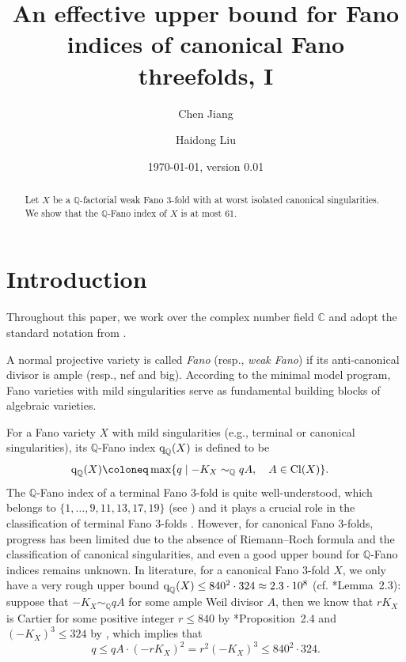\documentclass[12pt,twoside]{amsart}
\title[An effective upper bound for Fano indices]
{An effective upper bound for Fano indices of canonical Fano threefolds, I}
\date{\today, version 0.01}
\author{Chen Jiang}
\author{Haidong Liu}
\DeclareMathOperator{\Cl}{Cl}
\newcommand{\qQ}{\text{\rm q}_{\mathbb{Q}}}
\theoremstyle{definition}
\begin{document}
\begin{abstract}
    Let $X$ be a $\mathbb Q$-factorial weak Fano $3$-fold with at worst isolated canonical singularities. We show that the $\mathbb Q$-Fano index of $X$ is at most $61$.
\end{abstract}


\maketitle 
\tableofcontents


\section{Introduction}\label{sec1}

Throughout this paper, we work over the complex number field $\mathbb C$ and adopt the standard notation from \cites{kollar-mori}.

A normal projective variety is called \emph{Fano} (resp., \emph{weak Fano}) if its anti-canonical divisor is ample (resp., nef and big). According to the minimal model program,  Fano varieties with mild singularities serve as fundamental building blocks of algebraic varieties.

For a Fano variety  $X$ with mild singularities (e.g., terminal or canonical singularities), its $\mathbb Q$-Fano index $\qQ(X)$ is defined to be 
\begin{align*} 
    \qQ(X) {}&\coloneq \max\{q \mid -K_X \sim_{\mathbb Q}qA, \quad A\in \Cl (X) \}. 
\end{align*}
The $\mathbb{Q}$-Fano index of a terminal Fano $3$-fold is quite well-understood, which belongs to $\{1,\dots,9, 11, 13,17, 19\}$ (see \cites{suzuki, prokhorov2010}) and it plays a crucial role in the classification of terminal Fano $3$-folds \cites{suzuki,bs1,bs2,prokhorov2007,prokhorov2010,prokhorov2013,kasprzyk, liu-liu, liu-liu2024}. However, for canonical Fano $3$-folds, progress has been limited due to the absence of Riemann--Roch formula and the classification of canonical singularities, and even a good upper bound for $\mathbb{Q}$-Fano indices remains unknown. In literature, for a canonical Fano $3$-fold $X$, we only have a very rough upper bound $\qQ(X)\leq 840^2\cdot 324\approx 2.3\cdot 10^8$ (cf. \cite{Birkar4fold}*{Lemma~2.3}): suppose that $-K_X \sim_{\mathbb Q}qA$ for some ample Weil divisor $A$, then we know that $rK_X$ is Cartier for some positive integer $r\leq 840$ by \cite{CJ2016}*{Proposition~2.4} and $(-K_X)^3\leq 324$ by \cite{JZ}, which implies that 
\[
    q\leq qA\cdot (-rK_X)^2= r^2(-K_X)^3\leq 840^2\cdot 324.
\]
\end{document}
